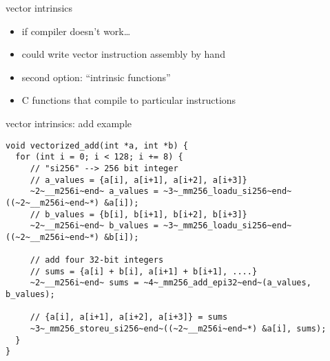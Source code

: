 \begin{frame}[fragile,label=vecIntr]{vector intrinsics}
\begin{itemize}
    \item if compiler doesn't work\ldots
    \item could write vector instruction assembly by hand
    \vspace{.5cm}
    \item second option: ``intrinsic functions''
    \item C functions that compile to particular instructions
\end{itemize}
\end{frame}

\begin{frame}[fragile,label=intrSum]{vector intrinsics: add example}
\begin{lstlisting}
void vectorized_add(int *a, int *b) {
  for (int i = 0; i < 128; i += 8) {
     // "si256" --> 256 bit integer
     // a_values = {a[i], a[i+1], a[i+2], a[i+3]}
     ~2~__m256i~end~ a_values = ~3~_mm256_loadu_si256~end~((~2~__m256i~end~*) &a[i]);
     // b_values = {b[i], b[i+1], b[i+2], b[i+3]}
     ~2~__m256i~end~ b_values = ~3~_mm256_loadu_si256~end~((~2~__m256i~end~*) &b[i]);

     // add four 32-bit integers
     // sums = {a[i] + b[i], a[i+1] + b[i+1], ....}
     ~2~__m256i~end~ sums = ~4~_mm256_add_epi32~end~(a_values, b_values);

     // {a[i], a[i+1], a[i+2], a[i+3]} = sums
     ~3~_mm256_storeu_si256~end~((~2~__m256i~end~*) &a[i], sums);
  }
}
\end{lstlisting}
\end{frame}
